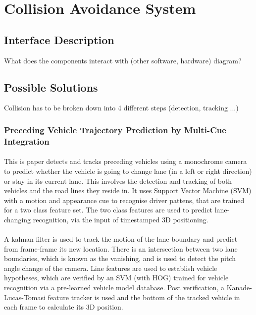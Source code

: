 \documentclass[a4paper]{report}
\begin{document}
\section{Collision Avoidance System}

\subsection{Interface Description} What does the components interact with (other software, hardware) diagram?

\subsection{Possible Solutions} Collision has to be broken down into 4 different steps (detection, tracking ...)

\subsubsection{Preceding Vehicle Trajectory Prediction by Multi-Cue Integration \citep{multi-cue}}

\paragraph {} This is paper \citep{multi-cue} detects and tracks preceding vehicles using a monochrome camera to predict whether the vehicle is going to change lane (in a left or right direction) or stay in its current lane. This involves the detection and tracking of both vehicles and the road lines they reside in. It uses Support Vector Machine (SVM) with a motion and appearance cue to recognise driver pattens, that are trained for a two class feature set. The two class features are used to predict lane-changing recognition, via the input of timestamped 3D positioning. 

\paragraph{}A kalman filter is used to track the motion of the lane boundary and predict from frame-frame its new location. There is an intersection between two lane boundaries, which is known as the vanishing, and is used to detect the pitch angle change of the camera. Line features are used to establish vehicle hypotheses, which are verified by an SVM (with HOG) trained for vehicle recognition via a pre-learned vehicle model database. Post verification, a Kanade-Lucas-Tomasi feature tracker is used and the bottom of the tracked vehicle in each frame to calculate its 3D position.
\end{document}
